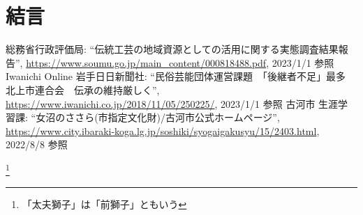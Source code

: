 \documentclass[12pt]{ltjsarticle}
\begin{document}
\section{結言}
\begin{thebibliography}{99}
 総務省行政評価局: ``伝統工芸の地域資源としての活用に関する実態調査結果報告'', \url{https://www.soumu.go.jp/main_content/000818488.pdf}, 2023/1/1 参照  
 Iwanichi Online 岩手日日新聞社: ``民俗芸能団体運営課題　「後継者不足」最多　北上市連合会　伝承の維持厳しく'', \url{https://www.iwanichi.co.jp/2018/11/05/250225/}, 2023/1/1 参照
 古河市 生涯学習課: ``女沼のささら(市指定文化財)/古河市公式ホームページ'', \url{https://www.city.ibaraki-koga.lg.jp/soshiki/syogaigakusyu/15/2403.html}, 2022/8/8 参照

\footnote{「太夫獅子」は「前獅子」ともいう}

\end{thebibliography}
\end{document}
